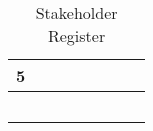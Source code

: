 \begin{table}[htbp]
\begin{tabular}{|p{.03\linewidth}|p{.22\linewidth}|p{.12\linewidth}|p{.13\linewidth}|p{.1\linewidth}|p{.1\linewidth}|p{.19\linewidth}|p{.1\linewidth}|}
5           &                                                       &                                                                                                                           &                      &                 &                                                                                                           &                                                                           &                     \\ \hline
            &                                                       &                                                                                                                           &                      &                 &                                                                                                           &                                                                           &                     \\ \hline
            &                                                       &                                                                                                                           &                      &                 &                                                                                                           &                                                                           &                     \\ \hline
            &                                                       &                                                                                                                           &                      &                 &                                                                                                           &                                                                           &                     \\ \hline
            &                                                       &                                                                                                                           &                      &                 &                                                                                                           &                                                                           &                     \\ \hline
            &                                                       &                                                                                                                           &                      &                 &                                                                                                           &                                                                           &                     \\ \hline
\end{tabular}
\caption{Stakeholder Register}
\label{tab:stakeholder}
\end{table}
